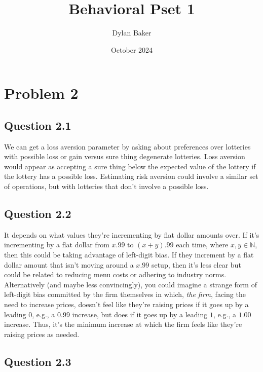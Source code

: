 \documentclass[10pt]{article}
\title{Behavioral Pset 1}
\author{Dylan Baker}
\date{October 2024}
\begin{document}
\maketitle

\section{Problem 2}

\subsection{Question 2.1}

We can get a loss aversion parameter by asking about preferences 
over lotteries with possible loss or gain versus sure thing 
degenerate lotteries. Loss aversion would appear as 
accepting a sure thing below the expected value of the lottery
if the lottery has a possible loss. Estimating risk aversion  
could involve a similar set of operations, but with lotteries 
that don't involve a possible loss.

\subsection{Question 2.2}

It depends on what values they're incrementing by flat dollar amounts over. 
If it's incrementing by a flat dollar from $x.99$ to $(x+y).99$
each time, where $x, y \in \mathbb{N}$, 
then this could be taking advantage of left-digit bias.
If they increment by a flat dollar amount that isn't moving 
around a $x.99$ setup, then it's less clear but could 
be related to reducing menu costs or adhering to industry norms.
Alternatively (and maybe less convincingly), you could imagine a strange form of 
left-digit bias committed by the firm 
themselves in which, \emph{the firm}, facing the need to increase prices,
doesn't feel like they're raising 
prices if it goes up by a leading $0$, e.g., a $0.99$ increase, but does 
if it goes up by a leading $1$, e.g., a $1.00$ increase. Thus, it's 
the minimum increase at which the firm feels like they're raising prices
as needed.

\subsection{Question 2.3}
\end{document}
